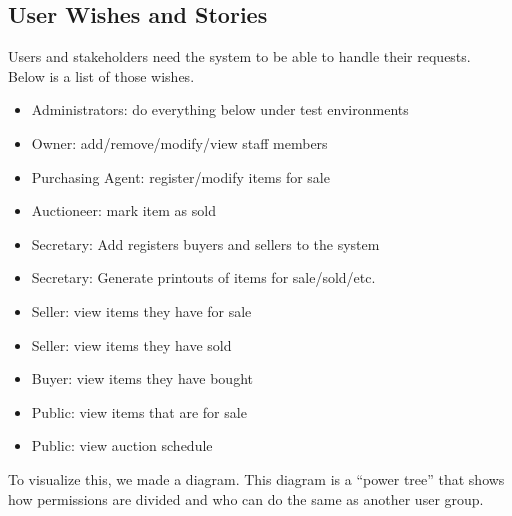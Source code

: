 \documentclass{article}
\begin{document}
\subsection*{User Wishes and Stories}
Users and stakeholders need the system to be able to handle their requests. Below is a list of those wishes.
\begin{itemize}[noitemsep]
	\item Administrators: do everything below under test environments
	\item Owner: add/remove/modify/view staff members
	\item Purchasing Agent: register/modify items for sale
	\item Auctioneer: mark item as sold
	\item Secretary: Add registers buyers and sellers to the system
	\item Secretary: Generate printouts of items for sale/sold/etc.
	\item Seller: view items they have for sale
	\item Seller: view items they have sold
	\item Buyer: view items they have bought
	\item Public: view items that are for sale
	\item Public: view auction schedule
\end{itemize}
To visualize this, we made a diagram. This diagram is a ``power tree'' that shows how permissions are divided and who can do the same as another user group.
\end{document}
